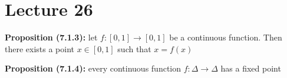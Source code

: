 \documentclass[12pt]{article}
\begin{document}
\clearpage

\section{Lecture 26}

\textbf{Proposition (7.1.3): }let $f:[0, 1] \rightarrow [0, 1]$ be a continuous function. Then there exists a point $x \in [0, 1]$ such that $x = f(x)$

\textbf{Proposition (7.1.4): }every continuous function $f: \Delta \rightarrow \Delta$ has a fixed point

\clearpage
\end{document}
